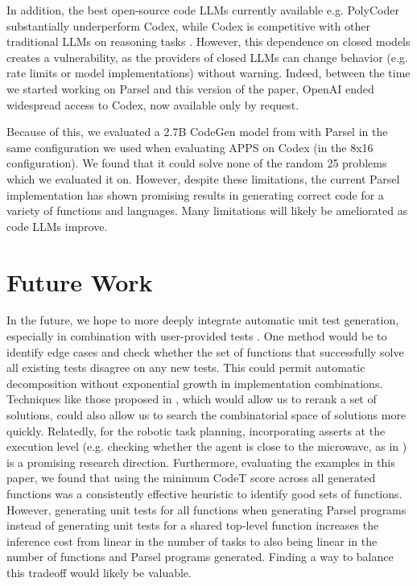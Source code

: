 In addition, the best open-source code LLMs currently available e.g. PolyCoder \citep{xu2022systematic} substantially underperform Codex, while Codex is competitive with other traditional LLMs on reasoning tasks \citep{liang2022holistic}. However, this dependence on closed models creates a vulnerability, as the providers of closed LLMs can change behavior (e.g. rate limits or model implementations) without warning. Indeed, between the time we started working on Parsel and this version of the paper, OpenAI ended widespread access to Codex, now available only by request.

Because of this, we evaluated a 2.7B CodeGen model from \citet{nijkamp2022codegen} with Parsel in the same configuration we used when evaluating APPS on Codex (in the 8x16 configuration). We found that it could solve none of the random 25 problems which we evaluated it on. However, despite these limitations, the current Parsel implementation has shown promising results in generating correct code for a variety of functions and languages. Many limitations will likely be ameliorated as code LLMs improve.

\section{Future Work}
\label{futurework}
In the future, we hope to more deeply integrate automatic unit test generation, especially in combination with user-provided tests \citep{daka2014survey,chen2022codet}. One method would be to identify edge cases and check whether the set of functions that successfully solve all existing tests disagree on any new tests. This could permit automatic decomposition without exponential growth in implementation combinations. Techniques like those proposed in \citet{zhang2022coder}, which would allow us to rerank a set of solutions, could also allow us to search the combinatorial space of solutions more quickly. Relatedly, for the robotic task planning, incorporating asserts at the execution level (e.g. checking whether the agent is close to the microwave, as in \citet{singh2022progprompt}) is a promising research direction. Furthermore, evaluating the examples in this paper, we found that using the minimum CodeT score across all generated functions was a consistently effective heuristic to identify good sets of functions. However, generating unit tests for all functions when generating Parsel programs instead of generating unit tests for a shared top-level function increases the inference cost from linear in the number of tasks to also being linear in the number of functions and Parsel programs generated. Finding a way to balance this tradeoff would likely be valuable.

